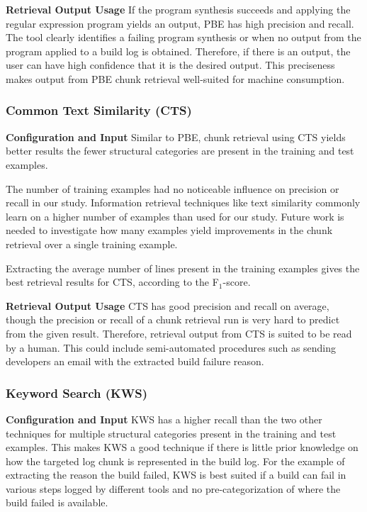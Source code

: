 \noindent
\textbf{Retrieval Output Usage}
If the program synthesis succeeds and applying the regular expression program yields an output, PBE has high precision and recall.
The tool clearly identifies a failing program synthesis or when no output from the program applied to a build log is obtained.
Therefore, if there is an output, the user can have high confidence that it is the desired output.
This preciseness makes output from PBE chunk retrieval well-suited for machine consumption.

\subsubsection{Common Text Similarity (CTS)}
\noindent
\textbf{Configuration and Input}
Similar to PBE, chunk retrieval using CTS yields better results the fewer structural categories are present in the training and test examples.

The number of training examples had no noticeable influence on precision or recall in our study.
Information retrieval techniques like text similarity commonly learn on a higher number of examples than used for our study.
Future work is needed to investigate how many examples yield improvements in the chunk retrieval over a single training example.

Extracting the average number of lines present in the training examples gives the best retrieval results for CTS, according to the F$_{1}$-score.

\noindent
\textbf{Retrieval Output Usage}
CTS has good precision and recall on average, though the precision or recall of a chunk retrieval run is very hard to predict from the given result.
Therefore, retrieval output from CTS is suited to be read by a human. This could include semi-automated procedures such as sending developers an email with the extracted build failure reason.

\subsubsection{Keyword Search (KWS)}
\noindent
\textbf{Configuration and Input}
KWS has a higher recall than the two other techniques for multiple structural categories present in the training and test examples.
This makes KWS a good technique if there is little prior knowledge on how the targeted log chunk is represented in the build log.
For the example of extracting the reason the build failed, KWS is best suited if a build can fail in various steps logged by different tools and no pre-categorization of where the build failed is available.

